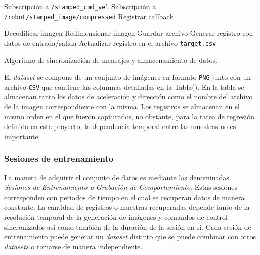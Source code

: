     \begin{algorithm}
        \begin{algorithmic}[1]
        \STATE Subscripción a \lstinline{/stamped_cmd_vel}
        \STATE Subscripción a \lstinline{/robot/stamped_image/compressed}
        \STATE Registrar callback
        
            \LOOP
                \STATE Decodificar imagen
                \STATE Redimensionar imagen
                \STATE Guardar archivo
                \STATE Generar registro con datos de entrada/salida
                \STATE Actualizar registro en el archivo \lstinline{target.csv}
            \ENDIF
            \ENDLOOP
        \ENDWHILE
        \end{algorithmic}
        \caption{Algoritmo de sincronización de mensajes y almacenamiento de datos.}\label{alg:msgsync}
    \end{algorithm}

    El \textit{dataset} se compone de un conjunto de imágenes en formato \lstinline{PNG} junto con un archivo \lstinline{CSV} que 
    contiene las columnas detalladas en la Tabla(). En la tabla se almacenan tanto los datos de aceleración y dirección como el 
    nombre del archivo de la imagen correspondiente con la misma. Los registros se almacenan en el mismo orden en el que fueron 
    capturados, no obstante, para la tarea de regresión definida en este proyecto, la dependencia temporal entre las muestras 
    no es importante. 

        \subsubsection{Sesiones de entrenamiento}
        La manera de adquirir el conjunto de datos es mediante las denominadas \textit{Sesiones de Entrenamiento o Grabación de Comportamiento}.
        Estas sesiones corresponden con periodos de tiempo en el cual se recuperan datos de manera constante. La cantidad de registros 
        o muestras recuperadas depende tanto de la resolución temporal de la generación de imágenes y comandos de control sincronizados 
        así como también de la duración de la sesión en sí. Cada sesión de entrenamiento puede generar un \textit{dataset} distinto 
        que se puede combinar con otros \textit{datasets} o tomarse de manera independiente. 

